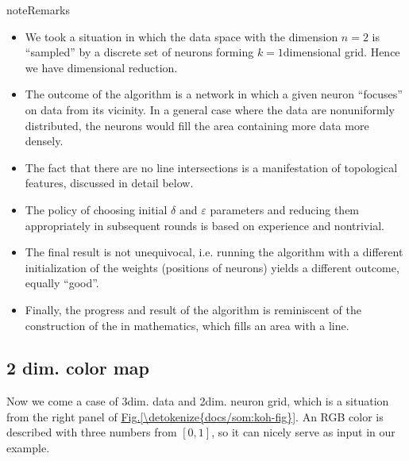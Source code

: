\documentclass[letterpaper,10pt,english]{jupyterBook}
\begin{document}
\begin{sphinxadmonition}{note}{Remarks}
\begin{itemize}
\item {} 
\sphinxAtStartPar
We took a situation in which the data space with the dimension \(n = 2\) is “sampled” by a discrete set of neurons forming  \(k=1\)\sphinxhyphen{}dimensional grid. Hence we have dimensional reduction.

\item {} 
\sphinxAtStartPar
The outcome of the algorithm is a network in which a given neuron “focuses” on data from its vicinity. In a general case where the data are non\sphinxhyphen{}uniformly distributed, the neurons would fill the area containing more data more densely.

\item {} 
\sphinxAtStartPar
The fact that there are no line intersections is a manifestation of topological features, discussed in detail below.

\item {} 
\sphinxAtStartPar
The policy of choosing initial \(\delta\) and \(\varepsilon \) parameters and reducing them appropriately in subsequent rounds is based on experience and non\sphinxhyphen{}trivial.

\item {} 
\sphinxAtStartPar
The final result is not unequivocal, i.e. running the algorithm with a different initialization of the weights (positions of neurons) yields a different outcome, equally “good”.

\item {} 
\sphinxAtStartPar
Finally, the progress and result of the algorithm is reminiscent of the construction of the  in mathematics, which fills an area with a line.

\end{itemize}
\end{sphinxadmonition}


\subsection{2 dim. color map}
\label{\detokenize{docs/som:dim-color-map}}
\sphinxAtStartPar
Now we come a case of 3\sphinxhyphen{}dim. data and 2\sphinxhyphen{}dim. neuron grid, which is a situation from the right panel of \hyperref[\detokenize{docs/som:koh-fig}]{Fig.\@ \ref{\detokenize{docs/som:koh-fig}}}. An RGB color is described with three numbers from \([0,1]\), so it can nicely serve as input in our example.
\end{document}
